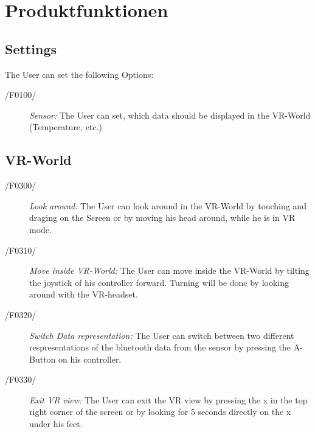 \section{Produktfunktionen}

\subsection{Settings}

The User can set the following Options:
\begin{description}
  \item[/F0100/] 
	\textit{Sensor:} The User can set, which data should be displayed in the VR-World (Temperature, etc.)
\end{description}

\subsection{VR-World}

\begin{description}
  \item[/F0300/]
    \textit{Look around:} The User can look around in the VR-World by touching and draging on the Screen or by moving his head around, while he is in VR mode.
\end{description}

\begin{description}
  \item[/F0310/]
    \textit{Move inside VR-World:} The User can move inside the VR-World by tilting the joystick of his controller forward. Turning will be done by looking around with the VR-headset.
\end{description}

\begin{description}
  \item[/F0320/]
    \textit{Switch Data representation:} The User can switch between two different respresentations of the bluetooth data from the sensor by pressing the A-Button on his controller.
\end{description}

\begin{description}
  \item[/F0330/]
    \textit{Exit VR view:} The User can exit the VR view by pressing the x in the top right corner of the screen or by looking for 5 seconds directly on the x under his feet.
\end{description}

